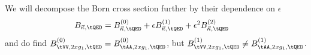We will decompose the Born cross section further by their dependence on $\epsilon$
\begin{align}
B_{\vec \kappa,\tQED} &= B^{(0)}_{\vec \kappa,\tQED} + \epsilon B^{(1)}_{\vec \kappa,\tQED} + \epsilon^2 B^{(2)}_{\vec \kappa,\tQED}
\end{align}
and do find $B^{(0)}_{\tVV,2xg_1,\tQED}=B^{(0)}_{\tAA,2xg_1,\tQED}$, but $B^{(1)}_{\tVV,2xg_1,\tQED}\neq B^{(1)}_{\tAA,2xg_1,\tQED}$.

